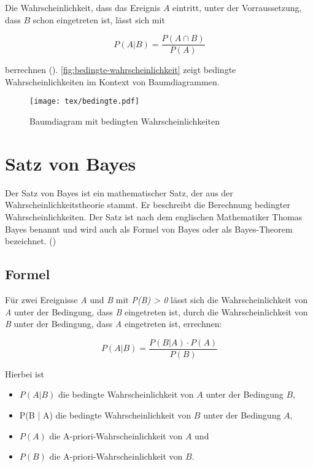 Die Wahrscheinlichkeit, dass das Ereignis $A$ eintritt, unter der Vorraussetzung, dass $B$ schon eingetreten ist, lässt sich mit

\begin{equation}
    P(A | B) = \frac{P(A \cap B)}{P(A)}
\end{equation}

berrechnen (\cite[404]{Papula:2014}).
\autoref{fig:bedingte-wahrscheinlichkeit} zeigt bedingte Wahrscheinlichkeiten im Kontext von Baumdiagrammen.

\begin{figure}
    \centering
    \texttt{[image: tex/bedingte.pdf]}
    \caption{Baumdiagram mit bedingten Wahrscheinlichkeiten}\label{fig:bedingte-wahrscheinlichkeit}
\end{figure}

\section{Satz von Bayes}

Der Satz von Bayes ist ein mathematischer Satz, der aus der Wahrscheinlichkeitstheorie stammt. Er beschreibt die Berechnung bedingter
Wahrscheinlichkeiten.
Der Satz ist nach dem englischen Mathematiker Thomas Bayes benannt und wird auch als Formel von Bayes oder als Bayes-Theorem bezeichnet. (\cite[S.406f]{Papula:2014})

\subsection{Formel}

Für zwei Ereignisse \textit{A} und \textit{B} mit \textit{P(B) > 0} lässt sich die Wahrscheinlichkeit von \textit{A} unter der Bedingung, dass \textit{B} eingetreten
ist, durch die Wahrscheinlichkeit von \textit{B} unter der Bedingung, dass \textit{A} eingetreten ist, errechnen:

\begin{equation}
    P(A | B) = \frac{P(B | A) \cdot P(A)}{P(B)}
\end{equation}

Hierbei ist

\begin{itemize}
    \item $P(A | B)$ die bedingte Wahrscheinlichkeit von $A$ unter der Bedingung $B$,
    \item P(B | A) die bedingte Wahrscheinlichkeit von $B$ unter der Bedingung $A$,
    \item $P(A)$ die A-priori-Wahrscheinlichkeit von $A$ und
    \item $P(B)$ die A-priori-Wahrscheinlichkeit von $B$.
\end{itemize}

